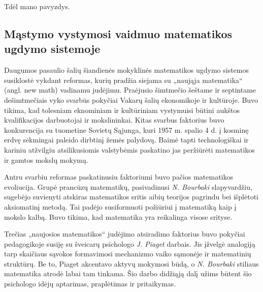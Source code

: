 \documentclass{article}
\begin{document}
Tdėl mano pavyzdys.
\subsection{Mąstymo vystymosi vaidmuo matematikos ugdymo sistemoje}

Daugumos pasaulio šalių šiandienės mokyklinės matematikos ugdymo sistemos
susiklostė vykdant reformas, kurių pradžia siejama su „naująja matematika“ (angl. new math) vadinamu judėjimu. Praėjusio šimtmečio šeštame ir septintame dešimtmečiais vyko svarbūs pokyčiai Vakarų šalių ekonomikoje ir kultūroje. Buvo tikima, kad tolesniam eknominiam ir kultūriniam vystymuisi būtini aukštos kvalifikacijos darbuotojai ir mokslininkai. Kitas svarbus faktorius buvo konkurencija su tuometine Sovietų Sąjunga, kuri 1957 m. spalio 4 d. į kosminę erdvę sėkmingai paleido dirbtinį žemės palydovą. Baimė tapti technologiškai ir kariniu atžvilgiu atsilikusiomis valstybėmis paskatino jas peržiūrėti matematikos ir gamtos mokslų mokymą.

Antru svarbiu reformas paskatinusiu faktoriumi buvo pačios matematikos evoliucija. Grupė prancūzų matematikų, pasivadinusi
\textit{N. Bourbaki} slapyvardžiu, sugebėjo suvienyti atskiras matematikos sritis aibių teorijos pagrindu bei išplėtoti aksiomatinį metodą. Tai padėjo susiformuoti požiūriui į matematiką kaip į mokslo kalbą. Buvo tikima, kad matematika yra reikalinga visose srityse.

Trečias „naujosios matematikos“ judėjimo atsiradimo faktorius buvo pokyčiai pedagogikoje susiję su šveicarų psichologo
\textit{J. Piaget} darbais.  Jis įžvelgė analogiją tarp skaičiaus sąvokos formavimosi mechanizmo vaiko sąmonėje ir matematinių struktūrų.  Be to, Piaget akcentavo aktyvų mokymosi būdą, o \textit{N. Bourbaki} stiliaus matematika atrodė labai tam tinkama.
Šio darbo didžiąją dalį užims būtent šio psichologo idėjų aptarimas, praplėtimas ir pritaikymas.
\end{document}
